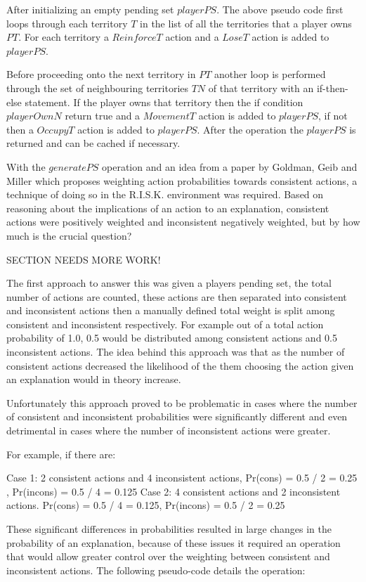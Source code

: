 \documentclass[parskip]{cs4rep}
\begin{document}
After initializing an empty pending set $playerPS$. The above pseudo code first loops through each territory $T$ in the list of all the territories that a player owns $PT$. For each territory a $ReinforceT$ action and a $LoseT$ action is added to $playerPS$. 

Before proceeding onto the next territory in $PT$ another loop is performed through the set of neighbouring territories $TN$ of that territory with an if-then-else statement. If the player owns that territory then the if condition $playerOwnN$ return true and a $MovementT$ action is added to $playerPS$, if not then a $OccupyT$ action is added to $playerPS$. After the operation the $playerPS$ is returned and can be cached if necessary.

With the $generatePS$ operation and an idea from a paper by Goldman, Geib and Miller \cite{Goldman99anew} which proposes weighting action probabilities towards consistent actions, a technique of doing so in the R.I.S.K. environment was required. Based on reasoning about the implications of an action to an explanation, consistent actions were positively weighted and inconsistent negatively weighted, but by how much is the crucial question?

SECTION NEEDS MORE WORK!

The first approach to answer this was given a players pending set, the total number of actions are counted, these actions are then separated into consistent and inconsistent actions then a manually defined total weight is split among consistent and inconsistent respectively. For example out of a total action probability of 1.0, 0.5 would be distributed among consistent actions and 0.5 inconsistent actions. The idea behind this approach was that as the number of consistent actions decreased the likelihood of the them choosing the action given an explanation would in theory increase.

Unfortunately this approach proved to be problematic in cases where the number of consistent and inconsistent probabilities were significantly different and even detrimental in cases where the number of inconsistent actions were greater. 

For example, if there are:

Case 1: 2 consistent actions and 4 inconsistent actions, Pr(cons) = 0.5 / 2 = 0.25 , Pr(incons) = 0.5 / 4 = 0.125 
Case 2: 4 consistent actions and 2 inconsistent actions. Pr(cons) = 0.5 / 4 = 0.125, Pr(incons) = 0.5 / 2 = 0.25

These significant differences in probabilities resulted in large changes in the probability of an explanation, because of these issues it required an operation that would allow greater control over the weighting between consistent and inconsistent actions. The following pseudo-code details the operation:
\end{document}
